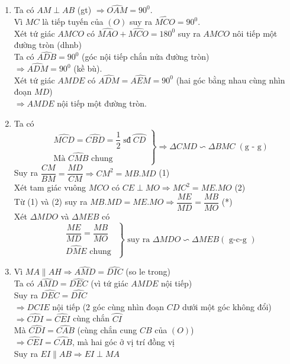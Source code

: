 \begin{ex}
{	\begin{enumerate}
	\item Ta có $AM \perp AB$ (gt) $\Rightarrow \widehat{OAM} = 90^0$.\\
    Vì $MC$ là tiếp tuyến của $(O)$ suy ra $\widehat{MCO} = 90^0$. \\
    Xét tứ giác $AMCO$ có $\widehat{MAO}+\widehat{MCO} = 180^0$ suy ra $AMCO$ nôi tiếp một đường tròn (dhnb)\\
    Ta có $\widehat{ADB} = 90^0$ (góc nội tiếp chắn nửa đường tròn)\\
    $\Rightarrow \widehat{ADM} = 90^0$ (kề bù).\\
    Xét tứ giác $AMDE$ có $\widehat{ADM} = \widehat{AEM}= 90^0$ (hai góc bằng nhau cùng nhìn đoạn $MD$) \\
    $\Rightarrow AMDE$ nội tiếp một đường tròn.
    \item Ta có 
    $$
    \left.
    \begin{aligned}
    &\widehat{MCD} = \widehat{CBD} = \dfrac{1}{2}\;\mbox{sđ}\;\wideparen{CD}\\
    &\mbox{Mà } \widehat{CMB} \mbox{ chung}
    \end{aligned}
    \right\}
    \Rightarrow \Delta CMD \backsim \Delta BMC\; (\mbox{g - g})
    $$
    Suy ra $\dfrac{CM}{BM} = \dfrac{MD}{CM}\Rightarrow CM^2 = MB.MD$ \quad (1)\\
    Xét tam giác vuông $MCO$ có $CE \perp MO \Rightarrow MC^2 = ME.MO$ \quad (2)\\
    Từ (1) và (2) suy ra $MB.MD = ME.MO\Rightarrow \dfrac{ME}{MD} = \dfrac{MB}{MO}$   \quad (*)\\
    Xét $\Delta MDO$ và $\Delta MEB$ có 
    $$
    \left.
    \begin{aligned}
    &\dfrac{ME}{MD} = \dfrac{MB}{MO}\\
    &\widehat{DME} \mbox{ chung }
    \end{aligned}
    \right\}
    \mbox{ suy ra } \Delta MDO\backsim \Delta MEB (\mbox{ g-c-g })
    $$
    
    
    \item  Vì $MA \parallel AH \Rightarrow \widehat{AMD} = \widehat{DIC}$ (so le trong)\\
    Ta có $\widehat{AMD} = \widehat{DEC}$ (vì tứ giác $AMDE$ nội tiếp)\\
    Suy ra $\widehat{DEC} = \widehat{DIC}$\\
    $\Rightarrow DCIE$ nội tiếp (2 góc cùng nhìn đoạn $CD$ dưới một góc không đổi)\\
    $\Rightarrow \widehat{CDI} = \widehat{CEI}$ cùng chắn $\wideparen{CI}$\\
    Mà $\widehat{CDI} = \widehat{CAB}$ (cùng chắn cung $CB$ của $(O)$)\\
    $\Rightarrow \widehat{CEI} = \widehat{CAB}$, mà hai góc ở vị trí đồng vị\\
    Suy ra $EI\parallel AB \Rightarrow EI\perp MA$
	\end{enumerate}
}



\end{ex}


